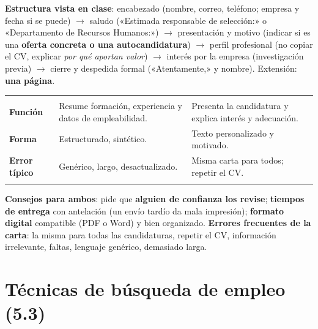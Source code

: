 \textbf{Estructura vista en clase}: encabezado (nombre, correo, teléfono; empresa y fecha si se puede) $\rightarrow$ saludo («Estimada responsable de selección:» o «Departamento de Recursos Humanos:») $\rightarrow$ presentación y motivo (indicar si es una \textbf{oferta concreta o una autocandidatura}) $\rightarrow$ perfil profesional (no copiar el CV, explicar \emph{por qué aportan valor}) $\rightarrow$ interés por la empresa (investigación previa) $\rightarrow$ cierre y despedida formal («Atentamente,» y nombre). Extensión: \textbf{una página}.

\begin{tabla}
\begin{tabularx}{\textwidth}{@{}>{\bfseries}l Y Y@{}}
\cab{} &  &  \\
\midrule
Función & Resume formación, experiencia y datos de empleabilidad. & Presenta la candidatura y explica interés y adecuación. \\
Forma & Estructurado, sintético. & Texto personalizado y motivado. \\
Error típico & Genérico, largo, desactualizado. & Misma carta para todos; repetir el CV. \\
\bottomrule
\end{tabularx}
\end{tabla}
\textbf{Consejos para ambos}: pide que \textbf{alguien de confianza los revise}; \textbf{tiempos de entrega} con antelación (un envío tardío da mala impresión); \textbf{formato digital} compatible (PDF o Word) y bien organizado. \textbf{Errores frecuentes de la carta}: la misma para todas las candidaturas, repetir el CV, información irrelevante, faltas, lenguaje genérico, demasiado larga.

\section{Técnicas de búsqueda de empleo (5.3)}
